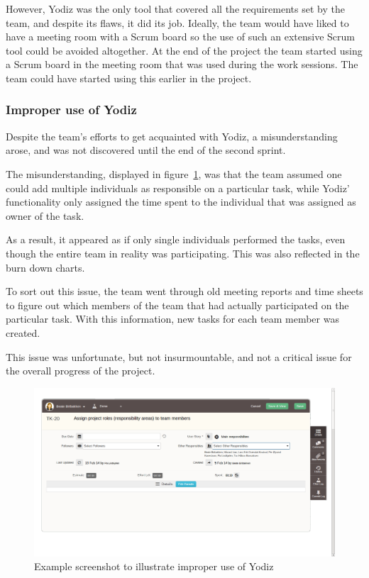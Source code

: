 However, Yodiz was the only tool that covered all the requirements set by the team, and despite its flaws, it did its job. Ideally, the team would have liked to have a meeting room with a Scrum board so the use of such an extensive Scrum tool could be avoided altogether. At the end of the project the team started using a Scrum board in the meeting room that was used during the work sessions. The team could have started using this earlier in the project.

\newpage
\subsubsection{Improper use of Yodiz}
\label{sec:improperScrum}
Despite the team's efforts to get acquainted with Yodiz, a misunderstanding arose, and was not discovered until the end of the second sprint.

The misunderstanding, displayed in figure~\ref{fig:wrongUse}, was that the team
assumed one could add multiple individuals as responsible on a particular task,
while Yodiz' functionality only assigned the time spent to the individual that was assigned as owner of the task.

As a result, it appeared as if only single individuals performed the tasks, even though the entire team in reality was participating. This was also reflected in the burn down charts. 

To sort out this issue, the team went through old meeting reports and time sheets to figure out which members of the team that had actually participated on the particular task. With this information, new tasks for each team member was created.

This issue was unfortunate, but not insurmountable, and not a critical
issue for the overall progress of the project.

\begin{figure}[H]
\includegraphics[width=\textwidth, clip, trim=1cm 2cm 4cm 1cm]{ch/retrospect/fig/wrongUse.png}
\caption{Example screenshot to illustrate improper use of Yodiz}
\label{fig:wrongUse}
\end{figure}

